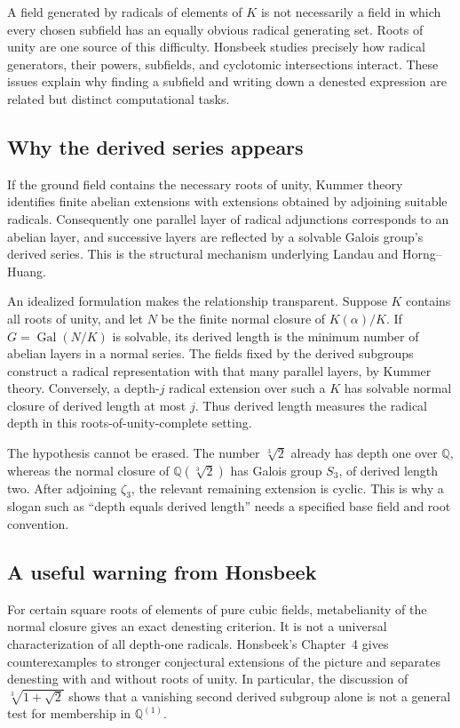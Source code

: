 \documentclass[11pt,a4paper]{article}
\newcommand{\Q}{\mathbb{Q}}
\newcommand{\Gal}{\operatorname{Gal}}
\newcommand{\cbrt}[1]{\sqrt[3]{#1}}
\theoremstyle{definition}
\theoremstyle{remark}
\numberwithin{equation}{section}
\begin{document}
A field generated by radicals of elements of $K$ is not necessarily a field in which every chosen subfield has an equally obvious radical generating set. Roots of unity are one source of this difficulty. Honsbeek studies precisely how radical generators, their powers, subfields, and cyclotomic intersections interact. These issues explain why finding a subfield and writing down a denested expression are related but distinct computational tasks.

\subsection{Why the derived series appears}

If the ground field contains the necessary roots of unity, Kummer theory identifies finite abelian extensions with extensions obtained by adjoining suitable radicals. Consequently one parallel layer of radical adjunctions corresponds to an abelian layer, and successive layers are reflected by a solvable Galois group's derived series. This is the structural mechanism underlying Landau and Horng--Huang.\cite{landau,horng1999,honsbeek2005}

An idealized formulation makes the relationship transparent. Suppose $K$ contains all roots of unity, and let $N$ be the finite normal closure of $K(\alpha)/K$. If $G=\Gal(N/K)$ is solvable, its derived length is the minimum number of abelian layers in a normal series. The fields fixed by the derived subgroups construct a radical representation with that many parallel layers, by Kummer theory. Conversely, a depth-$j$ radical extension over such a $K$ has solvable normal closure of derived length at most $j$. Thus derived length measures the radical depth in this roots-of-unity-complete setting.

The hypothesis cannot be erased. The number $\cbrt2$ already has depth one over $\Q$, whereas the normal closure of $\Q(\cbrt2)$ has Galois group $S_3$, of derived length two. After adjoining $\zeta_3$, the relevant remaining extension is cyclic. This is why a slogan such as ``depth equals derived length'' needs a specified base field and root convention.

\subsection{A useful warning from Honsbeek}

For certain square roots of elements of pure cubic fields, metabelianity of the normal closure gives an exact denesting criterion. It is not a universal characterization of all depth-one radicals. Honsbeek's Chapter~4 gives counterexamples to stronger conjectural extensions of the picture and separates denesting with and without roots of unity. In particular, the discussion of $\cbrt{1+\sqrt2}$ shows that a vanishing second derived subgroup alone is not a general test for membership in $\Q^{(1)}$.\cite{honsbeek2005}
\end{document}
